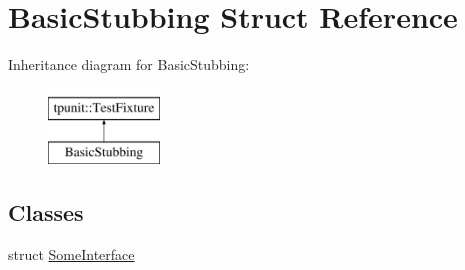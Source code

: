 \hypertarget{structBasicStubbing}{}\section{Basic\+Stubbing Struct Reference}
\label{structBasicStubbing}
Inheritance diagram for Basic\+Stubbing\+:\begin{figure}[H]
\begin{center}
\leavevmode
\includegraphics[height=2.000000cm]{structBasicStubbing}
\end{center}
\end{figure}
\subsection*{Classes}
\begin{DoxyCompactItemize}
\item 
struct \mbox{\hyperlink{structBasicStubbing_1_1SomeInterface}{Some\+Interface}}
\end{DoxyCompactItemize}
